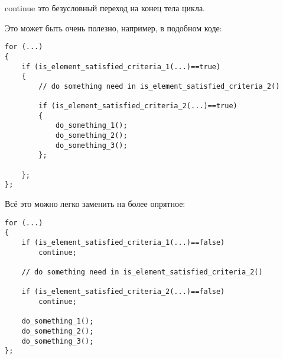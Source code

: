 continue это безусловный переход на конец тела цикла.

Это может быть очень полезно, например, в подобном коде:

\begin{lstlisting}
for (...)
{
	if (is_element_satisfied_criteria_1(...)==true)
	{
		// do something need in is_element_satisfied_criteria_2()

		if (is_element_satisfied_criteria_2(...)==true)
		{
			do_something_1();
			do_something_2();
			do_something_3();
		};

	};
};
\end{lstlisting}

Всё это можно легко заменить на более опрятное:

\begin{lstlisting}
for (...)
{
	if (is_element_satisfied_criteria_1(...)==false)
		continue;

	// do something need in is_element_satisfied_criteria_2()

	if (is_element_satisfied_criteria_2(...)==false)
		continue;

	do_something_1();
	do_something_2();
	do_something_3();
};
\end{lstlisting}

